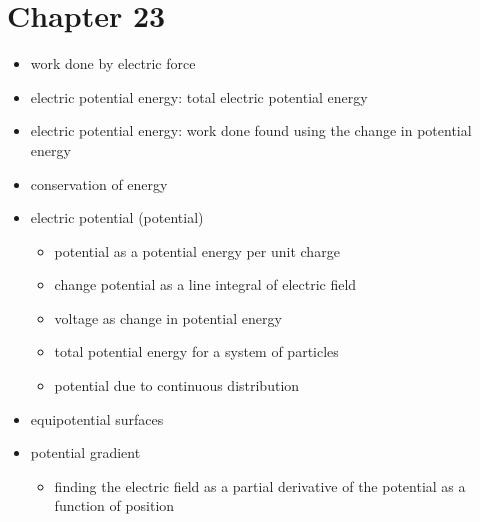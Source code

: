\documentclass[a4paper]{article}
\begin{document}
\section*{Chapter 23}
\begin{itemize}
  \item work done by electric force
  \item electric potential energy: total electric potential energy
  \item electric potential energy: work done  found using the change in potential energy
  \item conservation of energy
  \item electric potential (potential)
  \begin{itemize}
    \item potential as a potential energy per unit charge
    \item change potential as a line integral of electric field
    \item voltage as change in potential energy
    \item total potential energy for a system of particles
    \item potential due to continuous distribution
  \end{itemize}
  \item equipotential surfaces
  \item potential gradient
  \begin{itemize}
    \item finding the electric field as a partial derivative of the potential as a function of position
  \end{itemize}
\end{itemize}
\end{document}

